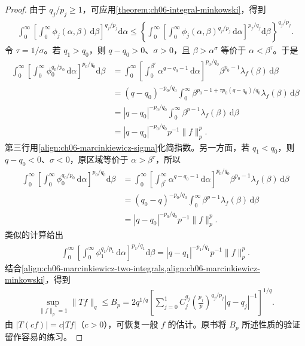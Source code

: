\documentclass[../../main.tex]{subfiles}
\begin{document}
\begin{proof}
由于 $q_j/p_j\geqslant1$，可应用\cref{theorem:ch06-integral-minkowski}，得到
\begin{align}
\int_0^\infty\left[\int_0^\infty\phi_j(\alpha,\beta)\,\mathrm d\beta\right]^{q_j/p_j}\mathrm d\alpha
\leqslant\left\{\int_0^\infty\left[\int_0^\infty\phi_j(\alpha,\beta)^{q_j/p_j}\,\mathrm d\alpha\right]^{p_j/q_j}\mathrm d\beta\right\}^{q_j/p_j}.
\label{align:ch06-marcinkiewicz-minkowski}
\end{align}
令 $\tau=1/\sigma$。若 $q_1>q_0$，则 $q-q_0>0$、$\sigma>0$，且 $\beta>\alpha^\sigma$ 等价于 $\alpha<\beta^\tau$。于是
\begin{align*}
\int_0^\infty\left[\int_0^\infty\phi_0^{q_0/p_0}\,\mathrm d\alpha\right]^{p_0/q_0}\mathrm d\beta
&=\int_0^\infty\left[\int_0^{\beta^\tau}\alpha^{q-q_0-1}\,\mathrm d\alpha\right]^{p_0/q_0}
\beta^{p_0-1}\lambda_f(\beta)\,\mathrm d\beta\\
&=(q-q_0)^{-p_0/q_0}\int_0^\infty
\beta^{p_0-1+\tau p_0(q-q_0)/q_0}\lambda_f(\beta)\,\mathrm d\beta\\
&=|q-q_0|^{-p_0/q_0}\int_0^\infty\beta^{p-1}\lambda_f(\beta)\,\mathrm d\beta\\
&=|q-q_0|^{-p_0/q_0}p^{-1}\|f\|_p^p.
\end{align*}
第三行用\cref{align:ch06-marcinkiewicz-sigma}化简指数。另一方面，若 $q_1<q_0$，则 $q-q_0<0$、$\sigma<0$，原区域等价于 $\alpha>\beta^\tau$，所以
\begin{align*}
\int_0^\infty\left[\int_0^\infty\phi_0^{q_0/p_0}\,\mathrm d\alpha\right]^{p_0/q_0}\mathrm d\beta
&=\int_0^\infty\left[\int_{\beta^\tau}^\infty\alpha^{q-q_0-1}\,\mathrm d\alpha\right]^{p_0/q_0}
\beta^{p_0-1}\lambda_f(\beta)\,\mathrm d\beta\\
&=(q_0-q)^{-p_0/q_0}\int_0^\infty\beta^{p-1}\lambda_f(\beta)\,\mathrm d\beta\\
&=|q-q_0|^{-p_0/q_0}p^{-1}\|f\|_p^p.
\end{align*}
类似的计算给出
\begin{align*}
\int_0^\infty\left[\int_0^\infty\phi_1^{q_1/p_1}\,\mathrm d\alpha\right]^{p_1/q_1}\mathrm d\beta
=|q-q_1|^{-p_1/q_1}p^{-1}\|f\|_p^p.
\end{align*}
结合\cref{align:ch06-marcinkiewicz-two-integrals,align:ch06-marcinkiewicz-minkowski}，得到
\begin{align*}
\sup_{\|f\|_p=1}\|Tf\|_q\leqslant
B_p=2q^{1/q}\left[\sum_{j=0}^1 C_j^{q_j}
\left(\frac{p_j}p\right)^{q_j/p_j}|q-q_j|^{-1}\right]^{1/q}.
\end{align*}
由 $|T(cf)|=c|Tf|$（$c>0$），可恢复一般 $f$ 的估计。原书将 $B_p$ 所述性质的验证留作容易的练习。


\end{proof}
\end{document}

